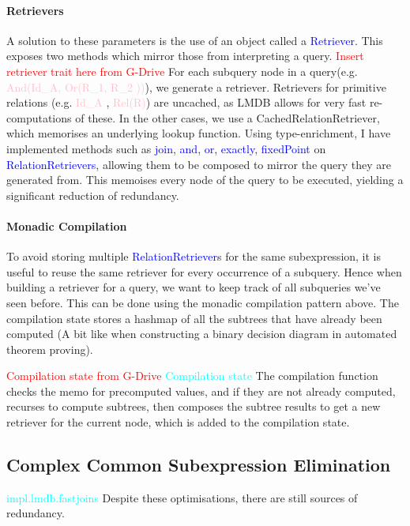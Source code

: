 \documentclass[12pt,a4paper,twoside,openright]{report}
\newcommand\todo[1]{\textcolor{red}{#1}}
\newcommand\codeName[1]{\textcolor{blue}{#1}}
\newcommand\note[1]{\textcolor{cyan}{#1}}
\newcommand\mathName[1]{\textcolor{pink}{#1}}
\begin{document}
		\paragraph{Retrievers}
		A solution to these parameters is the use of an object called a \codeName{Retriever}. This exposes two methods which mirror those from interpreting a query. 
		\todo{Insert retriever trait here from G-Drive}	
		For each subquery node in a query(e.g. \mathName{And(Id_A, Or(R_1, R_2 ))}), we generate a retriever. Retrievers for primitive relations (e.g. \mathName{Id_A} , \mathName{Rel(R)}) are uncached, as LMDB allows for very fast re-computations of these. In the other cases, we use a CachedRelationRetriever, which memorises an underlying lookup function. Using type-enrichment, I have implemented methods such as \codeName{join}, \codeName{and}, \codeName{or}, \codeName{exactly}, \codeName{fixedPoint} on \codeName{RelationRetrievers}, allowing them to be composed to mirror the query they are generated from. This memoises every node of the query to be executed, yielding a significant reduction of redundancy.
	
		
		\paragraph{Monadic Compilation}
		To avoid storing multiple \codeName{RelationRetriever}s for the same subexpression, it is useful to reuse the same retriever for every occurrence of a subquery. Hence when building a retriever for a query, we want to keep track of all subqueries we’ve seen before. This can be done using the monadic compilation pattern above. The compilation state stores a hashmap of all the subtrees that have already been computed (A bit like when constructing a binary decision diagram in automated theorem proving). 
		
		\todo{Compilation state from G-Drive}
		\note{Compilation state}
		The compilation function checks the memo for precomputed values, and if they are not already computed, recurses to compute subtrees, then composes the subtree results to get a new retriever for the current node, which is added to the compilation state.
		
	\subsection{Complex Common Subexpression Elimination}
	\note{impl.lmdb.fastjoins}
Despite these optimisations, there are still sources of redundancy.
\end{document}
